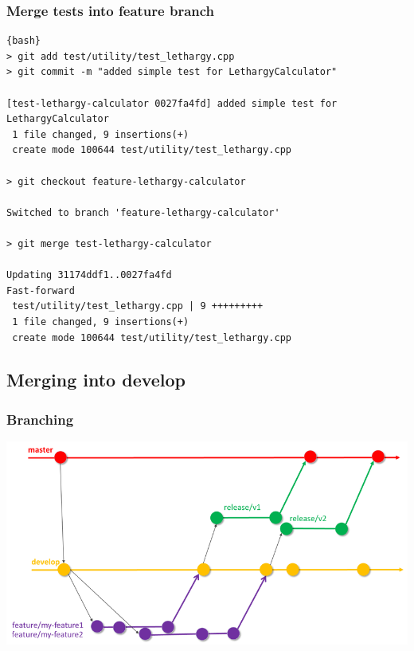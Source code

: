 \documentclass{beamer}
\begin{document}
\begin{frame}[fragile]
\frametitle{Merge tests into feature branch}
\tiny{
\begin{lstlisting}{bash}
> git add test/utility/test_lethargy.cpp
> git commit -m "added simple test for LethargyCalculator"

[test-lethargy-calculator 0027fa4fd] added simple test for LethargyCalculator
 1 file changed, 9 insertions(+)
 create mode 100644 test/utility/test_lethargy.cpp

> git checkout feature-lethargy-calculator

Switched to branch 'feature-lethargy-calculator'

> git merge test-lethargy-calculator

Updating 31174ddf1..0027fa4fd
Fast-forward
 test/utility/test_lethargy.cpp | 9 +++++++++
 1 file changed, 9 insertions(+)
 create mode 100644 test/utility/test_lethargy.cpp

\end{lstlisting}
}
\end{frame}

\subsection{Merging into develop}

\begin{frame}
\frametitle{Branching}
\centering
\includegraphics{../resources/branching.png}

\end{frame}
\end{document}
